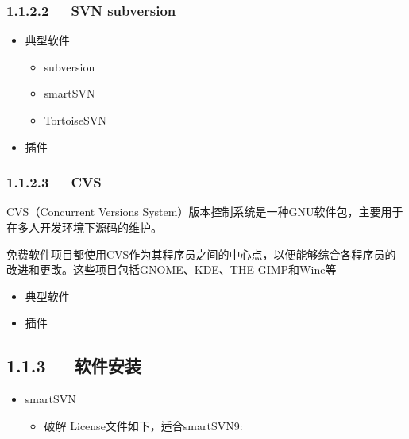 \documentclass[letterpaper,12pt,english]{sphinxmanual}
\begin{document}
\subsubsection{1.1.2.2   SVN subversion}
\label{\detokenize{001software/001install/_u7248_u672c_u63a7_u5236_u8f6f_u4ef6:svn-subversion}}\begin{itemize}
\item {} 
典型软件
\begin{itemize}
\item {} 
subversion

\item {} 
smartSVN

\item {} 
TortoiseSVN

\end{itemize}

\item {} 
插件

\end{itemize}


\subsubsection{1.1.2.3   CVS}
\label{\detokenize{001software/001install/_u7248_u672c_u63a7_u5236_u8f6f_u4ef6:cvs}}
\begin{DUlineblock}{0em}
\item[] CVS（Concurrent Versions System）版本控制系统是一种GNU软件包，主要用于在多人开发环境下源码的维护。
\item[] 免费软件项目都使用CVS作为其程序员之间的中心点，以便能够综合各程序员的改进和更改。这些项目包括GNOME、KDE、THE GIMP和Wine等
\end{DUlineblock}
\begin{itemize}
\item {} 
典型软件

\item {} 
插件

\end{itemize}


\subsection{1.1.3   软件安装}
\label{\detokenize{001software/001install/_u7248_u672c_u63a7_u5236_u8f6f_u4ef6:id6}}\begin{itemize}
\item {} 
smartSVN
\begin{itemize}
\item {} 
破解
License文件如下，适合smartSVN9:

\end{itemize}

\end{itemize}
\end{document}
